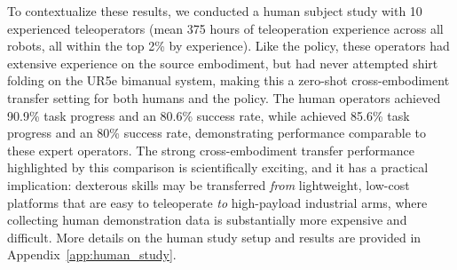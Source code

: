 To contextualize these results, we conducted a human subject study with 10 experienced teleoperators (mean 375 hours of teleoperation experience across all robots, all within the top 2\% by experience). Like the policy, these operators had extensive experience on the source embodiment, but had never attempted shirt folding on the UR5e bimanual system, making this a zero-shot cross-embodiment transfer setting for both humans and the policy. The human operators achieved 90.9\% task progress and an 80.6\% success rate, while \MethodName{} achieved 85.6\% task progress and an 80\% success rate, demonstrating performance comparable to these expert operators. The strong cross-embodiment transfer performance highlighted by this comparison is scientifically exciting, and it has a practical implication: dexterous skills may be transferred \textit{from} lightweight, low-cost platforms that are easy to teleoperate \textit{to} high-payload industrial arms, where collecting human demonstration data is substantially more expensive and difficult. More details on the human study setup and results are provided in Appendix~\ref{app:human_study}.

